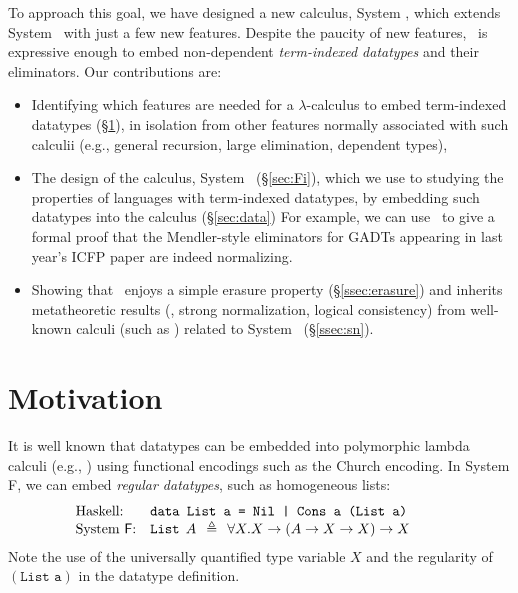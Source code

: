 To approach this goal, we have designed a new calculus, System \Fi,
which extends System \Fw\ with just a few new features. Despite
the paucity of new features, \Fi\
is expressive enough to embed non-dependent \emph{term-indexed datatypes}
and their eliminators. Our contributions are:\vspace*{-5pt}
\begin{itemize}
\item Identifying which features are needed for a $\lambda$-calculus
    to embed term-indexed datatypes (\S\ref{sec:motiv}),
    in isolation from other features normally associated with such calculii
    (e.g., general recursion, large elimination, dependent types),
    \vspace*{-2pt}
\item The design of the calculus, System \Fi\ (\S\ref{sec:Fi}), which we
    use to studying the properties of languages with term-indexed datatypes,
    by embedding such datatypes into the calculus (\S\ref{sec:data})
    For example, we can use \Fi\ to give a formal proof that the 
    Mendler-style eliminators
    for GADTs appearing in last year's ICFP paper \cite{AhnShe11} are
    indeed normalizing.
    \vspace*{-2pt}
\item Showing that \Fi\ enjoys a simple erasure property
    (\S\ref{ssec:erasure}) and inherits metatheoretic results
    (\eg, strong normalization, logical consistency)
    from well-known calculi (such as \Fw) related to System \Fi\ (\S\ref{ssec:sn}).
\end{itemize}\vspace*{-3pt}


\section{Motivation}
\label{sec:motiv}
It is well known that datatypes can be embedded into polymorphic lambda calculi
(e.g., \cite{AbeMatUus03}) using
functional encodings such as the Church encoding.
In System \textsf{F}, we can embed \emph{regular datatypes},
such as homogeneous lists:
\[\!\!\!\!\!\!\!\!\!
\begin{array}{ll}
\text{Haskell:} & \texttt{data List a = Nil | Cons a (List a)} \\
\text{System \textsf{F}:} & \texttt{{List}}\:\: A\:\:\triangleq\:\:\forall X.X\to(A\to X\to X)\to X ~~\;
\end{array}
\]
Note the use of the universally quantified type variable $X$
and the regularity of $(\texttt{List a})$ in the datatype definition.

